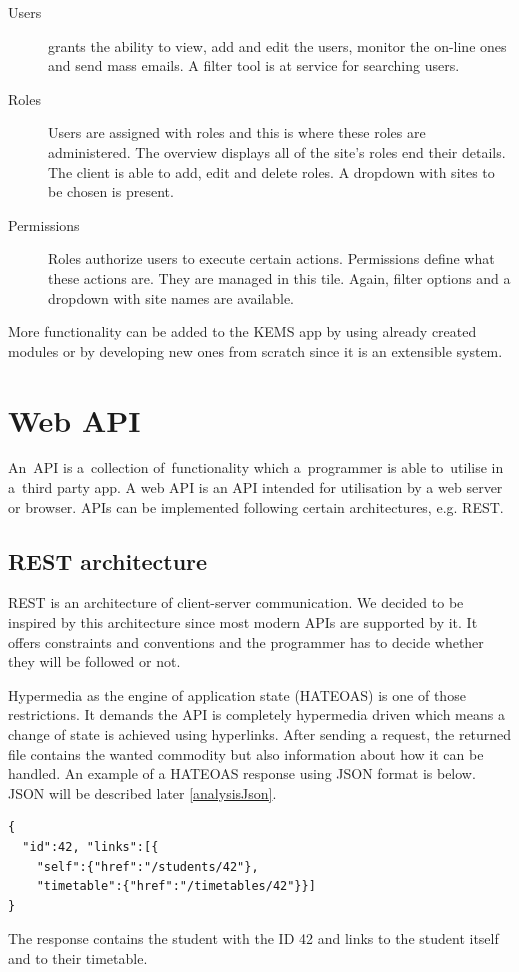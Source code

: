 \begin{description}
\begin {description}
	\item [Users] grants the ability to view, add and edit the users, monitor the on-line ones and send mass emails. A filter tool is at service for searching users.
	\item [Roles] Users are assigned with roles and this is where these roles are administered. The overview displays all of the site's roles end their details. The client is able to add, edit and delete roles. A dropdown with sites to be chosen is present. 
	\item [Permissions] Roles authorize users to execute certain actions. Permissions define what these actions are. They are managed in this tile. Again, filter options and a dropdown with site names are available. 
	\end{description}
\end{description}
More functionality can be added to the KEMS app by using already created modules or by developing new ones from scratch since it is an extensible system.

\section{Web API} \label{analysisWebAPI}
An~API is a~collection of~functionality which a~programmer is able to~utilise in a~third party app. A web API is an API intended for utilisation by a web server or browser. APIs can be implemented following certain architectures, e.g. REST.
\subsection{REST architecture} \label{analysisREST} \cite{rest}
REST is an architecture of client-server communication. We decided to be inspired by this architecture since most modern APIs are supported by it. It offers constraints and conventions and the programmer has to decide whether they will be followed or not. 

\cite{hateoas} Hypermedia as the engine of application state (HATEOAS) is one of those restrictions. It demands the API is completely hypermedia driven which means a change of state is achieved using hyperlinks. After sending a request, the returned file contains the wanted commodity but also information about how it can be handled. An example of a HATEOAS response using JSON format is below. JSON will be described later \ref{analysisJson}.
\lstset{style=sharpc, numbers=none}
\begin{lstlisting}
{
  "id":42, "links":[{ 
	"self":{"href":"/students/42"}, 
	"timetable":{"href":"/timetables/42"}}]
}
\end{lstlisting}
The response contains the student with the ID 42 and links to the student itself and to their timetable. 

